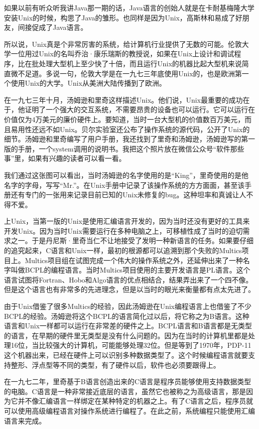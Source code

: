 \documentclass[
  letterpaper,
  DIV=11,
  numbers=noendperiod]{scrreprt}
\begin{document}
如果以前有听众听我讲Java那一期的话，Java语言的创始人就是在卡耐基梅隆大学安装Unix的时候，构思了Java的雏形。也同样是因为Unix，高斯林和易成了好朋友，间接促成了Java语言。

所以说，Unix真是个非常厉害的系统，给计算机行业提供了无数的可能。伦敦大学一位用过Unix的名叫乔治·康乐瑞斯的教授说，如果在Unix上设计和调试程序，比在批处理大型机上至少快了十倍，而且运行Unix的机器比起大型机来说简直微不足道。多说一句，伦敦大学是在一九七三年底使用Unix的，也是欧洲第一个使用Unix的大学。Unix从美洲大陆传播到了欧洲。

在一九七三年十月，汤姆逊和里奇这样描述Unix。他们说，Unix最重要的成功在于，他证明了一个强大的交互系统，不需要昂贵的设备也可以运行。它可以运行在价值仅为4万美元的廉价硬件上。要知道，当时一台大型机的价值数百万美元，而且易用性还远不如Unix。贝尔实验室还公布了操作系统的源代码，公开了Unix的细节。汤姆逊和里奇编写了用户手册，我还找到了里奇和汤姆逊，汤姆逊写的第一版的手册，一个system调用的说明书。我把这个照片放在微信公众号``软件那些事''里，如果有兴趣的读者可以看一看。

我们通过这张图可以看出，当时汤姆逊的名字使用的是``King''，里奇使用的是他名字的字母，写写``Mr.''。在Unix手册中记录了该操作系统的方方面面，甚至该手册还有专门的一张用来记录目前已知的Unix未修复的bug。这种坦率和真诚让人不得不爱。

上Unix，当第一版的Unix是使用汇编语言开发的，因为当时还没有更好的工具来开发Unix。因为当时Unix需要运行在多种电脑之上，可移植性成了当时的迫切需求之一。于是丹尼斯·里奇当仁不让地接受了发明一种新语言的任务。如果要仔细的追究起来，C语言和Unix一样，最初的根源都可以追溯到那个失败的Multics项目上。Multics项目组在试图完成一个伟大的操作系统之外，还延伸出来了一种名字叫做BCPL的编程语言。当时Multics项目使用的主要开发语言是PL语言。这个语言试图将Fortran、Hobo和Algo语言的优点相结合，结果弄出来了一个四不像。但是这个语言也有非常多的先进理念，但是以当时的眼光来衡量都有点太先进了。

由于Unix借鉴了很多Multics的经验，因此汤姆逊在Unix编程语言上也借鉴了不少BCPL的经验。汤姆逊将这个BCPL的语言简化过以后，将它称之为B语言。这种语言和Unix一样都可以运行在非常差的硬件之上。BCPL语言和B语言都是无类型的语言，在早期的硬件里无类型是没有什么问题的。因为在当时的计算机里都是处理16位，当比较强大的计算机，可能能够处理32位。但是等到了1970年，PDP-11这个机器出来，已经在硬件上可以识别多种数据类型了。这个时候编程语言就要支持整形、浮点型等不同的类型，有了硬件以后，软件也必须要跟得上。

在一九七二年，里奇基于B语言创造出来的C语言是程序员能够使用支持数据类型的电脑。C语言是一种非常接近底层的语言，虽然它也被称之为高级语言，那是因为它并不像汇编语言一样绑定在某种特定的机器之上。有了C语言之后，程序员就可以使用高级编程语言对操作系统进行编程了。在此之前，系统编程只能使用汇编语言来完成。
\end{document}
